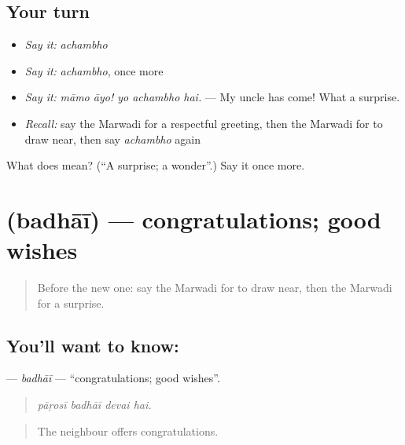\subsection*{Your turn}
\begin{itemize}
\raggedright
  \item \emph{Say it:} \emph{achambho}
  \item \emph{Say it:} \emph{achambho}, once more
  \item \emph{Say it:} \emph{māmo āyo! yo achambho hai.} — My uncle has come! What a surprise.
  \item \emph{Recall:} say the Marwadi for a respectful greeting, then the Marwadi for to draw near, then say \emph{achambho} again
\end{itemize}

\begin{tcolorbox}[breakable,colback=teal!4,colframe=teal!35!black,title={Before you move on}]
What does  mean? (\textquotedblleft{}A surprise; a wonder\textquotedblright{}.) Say it once more.
\end{tcolorbox}
\section[\texorpdfstring{\mw{बधाई} (badhāī)}{बधाई (badhāī)}]{ (badhāī) — congratulations; good wishes}

\label{lesson:MW-C245-badhai}



\begin{quote}
Before the new one: say the Marwadi for to draw near, then the Marwadi for a surprise.
\end{quote}

\subsection*{You'll want to know: }
\textbf{} — \emph{badhāī} — \textquotedblleft{}congratulations; good wishes\textquotedblright{}.

\begin{quote}
   
\end{quote}

\begin{quote}
\emph{pāṛosī badhāī devai hai.}
\end{quote}

\begin{quote}
The neighbour offers congratulations.
\end{quote}

